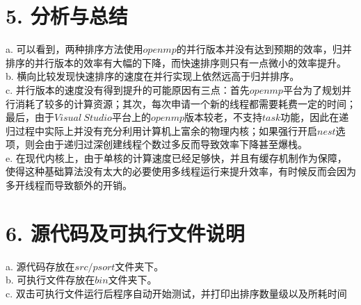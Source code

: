 \documentclass[12pt]{article}
\begin{document}
  \section*{5. 分析与总结}
  a. 可以看到，两种排序方法使用$openmp$的并行版本并没有达到预期的效率，归并排序的并行版本的效率有大幅的下降，而快速排序则只有一点微小的效率提升。\\
  b. 横向比较发现快速排序的速度在并行实现上依然远高于归并排序。\\
  c. 并行版本的速度没有得到提升的可能原因有三点：首先$openmp$平台为了规划并行消耗了较多的计算资源；其次，每次申请一个新的线程都需要耗费一定的时间；最后，由于$Visual \: Studio$平台上的$openmp$版本较老，不支持$task$功能，因此在递归过程中实际上并没有充分利用计算机上富余的物理内核；如果强行开启$nest$选项，则会由于递归过深创建线程个数过多反而导致效率下降甚至爆栈。\\
  e. 在现代内核上，由于单核的计算速度已经足够快，并且有缓存机制作为保障，使得这种基础算法没有太大的必要使用多线程运行来提升效率，有时候反而会因为多开线程而导致额外的开销。
  \section*{6. 源代码及可执行文件说明}
  a. 源代码存放在$src/psort$文件夹下。\\
  b. 可执行文件存放在$bin$文件夹下。\\
  c. 双击可执行文件运行后程序自动开始测试，并打印出排序数量级以及所耗时间
\end{document}
